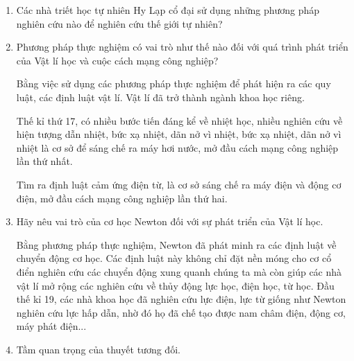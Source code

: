 \setcounter{section}{0}
\begin{enumerate}[label=\bfseries Câu \arabic*:]
	\item {}
	
	{
		
		Các nhà triết học tự nhiên Hy Lạp cổ đại sử dụng những phương pháp nghiên cứu nào để nghiên cứu thế giới tự nhiên?
		
	}
	
	
	\item {}
	
	
	{
		Phương pháp thực nghiệm có vai trò như thế nào đối với quá trình phát triển của Vật lí học và cuộc cách mạng công nghiệp?
		
	}
	
	\hideall
	{
		Bằng việc sử dụng các phương pháp thực nghiệm để phát hiện ra các quy luật, các định luật vật lí. Vật lí đã trở thành ngành khoa học riêng.
		
		Thế kỉ thứ 17, có nhiều bước tiến đáng kể về nhiệt học, nhiều nghiên cứu về hiện tượng dẫn nhiệt, bức xạ nhiệt, dãn nở vì nhiệt, bức xạ nhiệt, dãn nở vì nhiệt là cơ sở để sáng chế ra máy hơi nước, mở đầu cách mạng công nghiệp lần thứ nhất.
		
		Tìm ra định luật cảm ứng điện từ, là cơ sở sáng chế ra máy điện và động cơ điện, mở đầu cách mạng công nghiệp lần thứ hai.
		
		
	}
	\item {}
	
	
	{
		Hãy nêu vai trò của cơ học Newton đối với sự phát triển của Vật lí học.
	}
	
	\hideall
	{
		Bằng phương pháp thực nghiệm, Newton đã phát minh ra các định luật về chuyển động cơ học. Các định luật này không chỉ đặt nền móng cho cơ cổ điển nghiên cứu các chuyển động xung quanh chúng ta mà còn giúp các nhà vật lí mở rộng các nghiên cứu về thủy động lực học, điện học, từ học. Đầu thế kỉ 19, các nhà khoa học đã nghiên cứu lực điện, lực từ giống như Newton nghiên cứu lực hấp dẫn, nhờ đó họ đã chế tạo được nam châm điện, động cơ, máy phát điện...
		
	}
	\item {}
	
	
	{
		Tầm quan trọng của thuyết tương đối.
	}
	

\end{enumerate}
